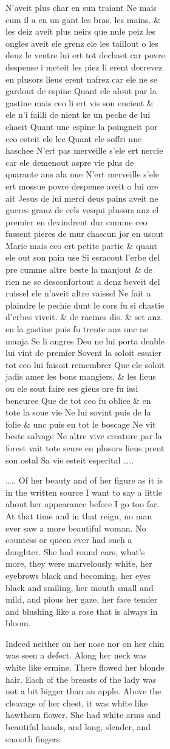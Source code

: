\documentclass[
  letterpaper,
  DIV=11,
  numbers=noendperiod,
  oneside]{scrreprt}
\begin{document}
\begin{figure}
\begin{figure}
\begin{figure}
\begin{minipage}{0.20\linewidth}
{N'}aveit {plus} char en sun traiant {Ne mais} cum il a en un gant les
bras. les mains. \& les deiz aveit {plus neirs que nule peiz} les ongles
aveit ele grenz ele les taillout o les denz le ventre lui ert tot
dechaet car povre despense i meteit les piez li erent decrevez en
plusors lieus erent nafrez car ele {ne} se gardout de espine Quant ele
alout par la gastine mais ceo li ert vis son encient \& ele {n'}i failli
de {nient} ke un peche de lui chaeit Quant une espine la poingneit por
ceo esteit ele lee Quant ele soffri une haschee {N'ert pas merveille}
s'ele ert {nercie} car ele demenout aspre vie plus de quarante ans ala
nue {N'ert merveille} s'ele ert mossue povre despense aveit o lui ore
ait Jesus de lui merci deus pains aveit {ne gueres granz} de cels vesqui
plusors anz el premier en devindrent dur cumme ceo fussent pieres de mur
chascun jor en usout Marie mais ceo ert petite partie \& quant ele out
son pain use Si esracout l'erbe del pre cumme altre beste la manjout \&
{de rien ne} se desconfortout a denz beveit del ruissel ele {n'}aveit
altre vaissel {Ne} fait a plaindre le pechie dunt le cors fu si chastie
d'erbes viveit. \& de racines dis. \& set anz. en la gastine puis fu
trente anz {unc ne} manja Se li angres Deu ne lui porta deable lui vint
de premier Sovent la soloit essaier tot ceo lui faisoit remembrer Que
ele soloit jadis amer les bons mangiers. \& les lieus ou ele sout faire
ses gieus ore fu issi beneuree Que de tot ceo fu obliee \& en tote la
soue vie {Ne} lui sovint {puis} de la folie \& {unc puis} en tot le
boscage {Ne} vit beste salvage {Ne} altre vive creature par la forest
vait tote seure en plusors lieus prent son ostal Sa vie esteit esperital
\ldots..

\ldots.. Of her beauty and of her figure as it is in the written source
I want to say a little about her appearance before I go too far. At that
time and in that reign, {no} man {ever} saw a more beautiful woman. {No}
countess {or} queen {ever had} such a daughter. She had round ears,
what's more, they were marvelously {white,} her eyebrows {black} and
becoming, her eyes {black} and smiling, her mouth small and mild, and
pious her gaze, her face tender and {blushing} {like a rose that is
always in bloom.}

{Indeed neither} on her nose {nor} on her chin was seen a defect. Along
her neck was {white like ermine.} There flowed her {blonde} hair. Each
of the breasts of the lady was {not a bit bigger} than an apple. Above
the cleavage of her chest, it was {white like hawthorn flower.} She had
{white arms} and {beautiful} hands, and long, slender, and smooth
fingers.


\end{minipage}
\end{figure}
\end{figure}
\end{figure}
\end{document}
